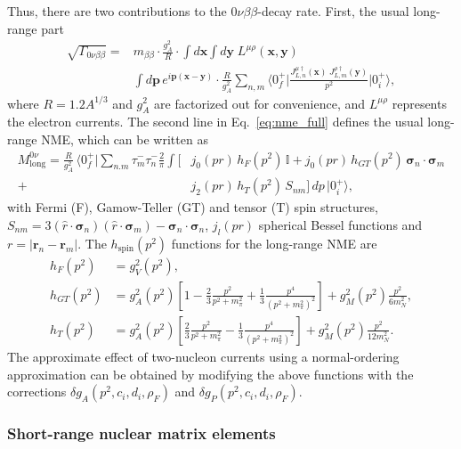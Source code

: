Thus, there are two contributions to the $0\nu\beta\beta$-decay rate. First, the usual long-range part~\cite{Engel:2016xgb}
\begin{align}
\label{eq:nme_full}
  \sqrt{\Gamma_{0\nu\beta\beta}} = & m_{\beta\beta}  \cdot \frac{g_A^2}{R} \cdot    \!\int \!d\bm x \!\int \!d\bm y \;L^{\mu\rho}(\bm x, \bm y) 
  \nonumber \\ & \int \!d\bm p\,e^{i\bm p({\bm x -\bm y})}\cdot 
  \frac{R}{g_A^2} \sum_{n,m}
  \langle 0^+_f\rvert
  \frac{{J}_{L,n}^{\mu\dagger} ({\bm x})\;{J}_{L,m}^{\rho\dagger}({\bm y})}{{ p}^2}
  \lvert 0^+_i\rangle,
\end{align}
where $R=1.2A^{1/3}$ and $g_A^2$ are factorized out for convenience, and $L^{\mu\rho}$ represents the electron currents. The second line in Eq.~\eqref{eq:nme_full} defines the usual long-range NME, which can be written as
\begin{align}
\label{eq:nme}
  M^{0\nu}_\text{long} = \frac{R}{g_A^2}\,
  \langle 0^+_f\rvert
  \sum_{n.m}
  \tau^-_m\tau^-_n \frac{2}{\pi}\int \big[
    &j_0(pr)\,h_F(p^2)\,\mathbb{I}+j_0(pr)\,h_{GT}(p^2)\,{\bm \sigma}_n\cdot{\bm \sigma}_m \nonumber \\
    +&j_2(pr)\,h_T(p^2)\,S_{nm}
    \big]\,d p\,
  \lvert 0^+_i\rangle, %
\end{align}
with Fermi (F), Gamow-Teller (GT) and tensor (T) spin structures, $S_{nm}=3({\hat r}\cdot{\bm \sigma}_n)({\hat r}\cdot{\bm \sigma}_m)-{\bm \sigma}_n\cdot{\bm \sigma}_n$, $j_l(pr)$ spherical Bessel functions and $r=\lvert{\bm r}_n-{\bm r}_m\rvert$. The $h_\text{spin}(p^2)$ functions for the long-range NME are
\begin{align}
\label{eq:nu_potentials_explicit}
h_{F}(p^2)&=g_V^2(p^2), \nonumber \\
h_{GT}(p^2)&=g_A^2(p^2)\left[1-\frac{2}{3}\frac{p^2}{p^2+m_\pi^2}+\frac{1}{3}\frac{p^4}{(p^2+m_\pi^2)^2}\right]+g_M^2(p^2)\frac{p^2}{6m_N^2}, \nonumber \\
h_{T}(p^2)&=g_A^2(p^2)\left[\frac{2}{3}\frac{p^2}{p^2+m_\pi^2}-\frac{1}{3}\frac{p^4}{(p^2+m_\pi^2)^2}\right]+g_M^2(p^2)\frac{p^2}{12m_N^2}.
\end{align}
The approximate effect of two-nucleon currents using a normal-ordering approximation can be obtained by modifying the above functions with the corrections $\delta g_A(p^2,c_i,d_i,\rho_F)$ and $\delta g_P(p^2,c_i,d_i,\rho_F)$.

\subsubsection{Short-range nuclear matrix elements}


